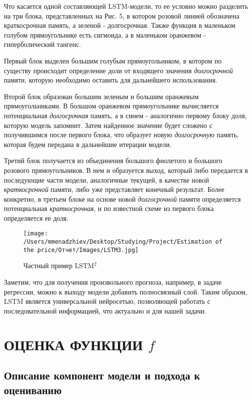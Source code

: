 Что касается одной составляющей LSTM-модели, то ее условно можно разделить на три блока, представленных на Рис. 5, в котором розовой линией обозначена краткосрочная память, а зеленой - долгосрочная. Также функция в маленьком голубом прямоугольнике есть сигмоида, а в маленьком оранжевом - гиперболический тангенс.

Первый блок выделен большим голубым прямоугольником, в котором по существу происходит определение доли от входящего значения \textit{долгосрочной} памяти, которую необходимо оставить для дальнейшего использования.

Второй блок образован большим зеленым и большим оранжевым прямоугольниками. В большом оранжевом прямоугольнике вычисляется потенциальная \textit{долгосрочная} память, а в синем - аналогично первому блоку доля, которую модель запомнит. Затем найденное значение будет сложено с получившимся после первого блока, что образует новую \textit{долгосрочную} память, которая будем передана в дальнейшие итерации модели.

Третий блок получается из объединения большого фиолетого и большого розового прямоугольников. В нем и образуется выход, который либо передается в последующие части модели, аналогичные текущей, в качестве новой \textit{краткосрочной} памяти, либо уже представляет конечный результат. Более конкретно, в третьем блоке на основе новой \textit{долгосрочной} памяти определяется потенциальная \textit{краткосрочная}, и по известной схеме из первого блока определяется ее доля.

\begin{figure}[H]
    \centering
    \texttt{[image: /Users/mmenadzhiev/Desktop/Studying/Project/Estimation of the price/Отчет/Images/LSTM3.jpg]}
    \caption{Частный пример LSTM$\text{}^2$}
\end{figure}

Заметим, что для получения произвольного прогноза, например, в задаче регрессии, можно к выходу модели добавить полносвязный слой. Таким образом, LSTM является универсальной нейросетью, позволяющей работать с последовательной информацией, что актуально и для нашей задачи.

\section{ОЦЕНКА ФУНКЦИИ $f$}

\subsection{Описание компонент модели и подхода к оцениванию}

